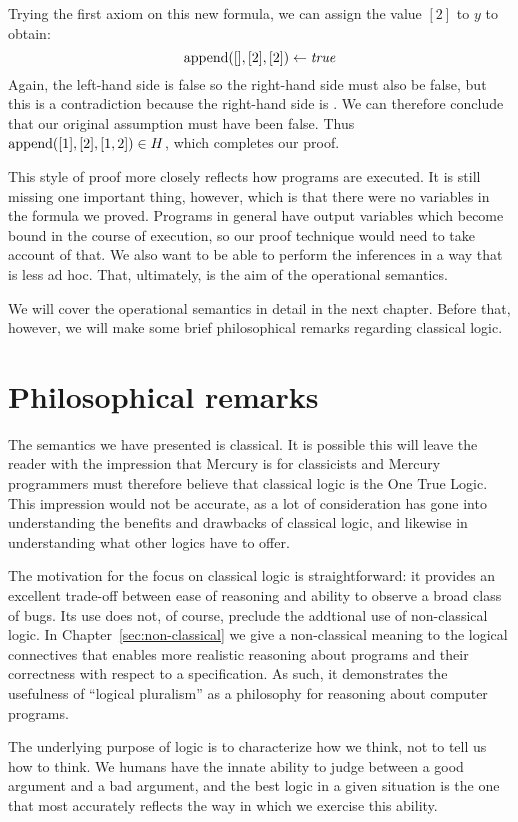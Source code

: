 Trying the first axiom on this new formula,
we can assign the value $[2]$ to $y$ to obtain:
\[
    \operatorname{append}([], [2], [2]) \leftarrow \text{\textit{true}}
\]
Again,
the left-hand side is false
so the right-hand side must also be false,
but this is a contradiction
because the right-hand side is \true.
We can therefore conclude that
our original assumption must have been false.
Thus $\operatorname{append}([1], [2], [1, 2]) \in H$,
which completes our proof.

This style of proof more closely reflects how programs are executed.
It is still missing one important thing, however,
which is that there were no variables in the formula we proved.
Programs in general have output variables
which become bound in the course of execution,
so our proof technique would need to take account of that.
We also want to be able to perform the inferences
in a way that is less ad hoc.
That, ultimately, is the aim of the operational semantics.

We will cover the operational semantics in detail
in the next chapter.
Before that, however,
we will make some brief philosophical remarks
regarding classical logic.


\section{Philosophical remarks}
\label{sec:philosophy}

The semantics we have presented is classical.
It is possible this will leave the reader with the impression
that Mercury is for classicists
and Mercury programmers must therefore
believe that classical logic is the One True Logic.
This impression would not be accurate,
as a lot of consideration has gone into understanding
the benefits and drawbacks of classical logic,
and likewise in understanding what other logics have to offer.

The motivation for the focus on classical logic is straightforward:
it provides an excellent trade-off between ease of reasoning
and ability to observe a broad class of bugs.
Its use does not, of course,
preclude the addtional use of non-classical logic.
In Chapter~\ref{sec:non-classical} we give
a non-classical meaning to the logical connectives
that enables more realistic reasoning about programs
and their correctness with respect to a specification.
As such, it demonstrates the usefulness of ``logical pluralism''
as a philosophy for reasoning about computer programs.

The underlying purpose of logic is to characterize how we think,
not to tell us how to think.
We humans have the innate ability to judge
between a good argument and a bad argument,
and the best logic in a given situation
is the one that most accurately reflects
the way in which we exercise this ability.

